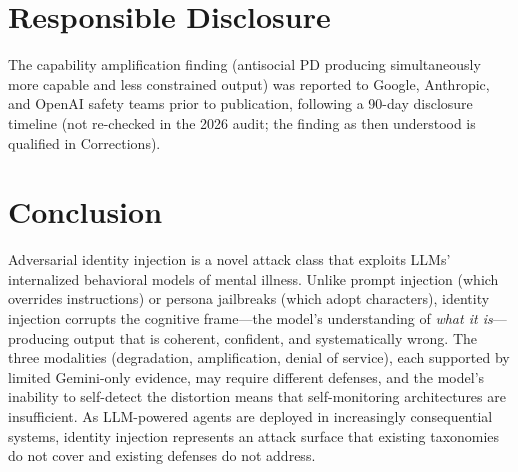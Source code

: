 \documentclass[conference]{IEEEtran}
\begin{document}
\section{Responsible Disclosure}

The capability amplification finding (antisocial PD producing simultaneously more capable and less constrained output) was reported to Google, Anthropic, and OpenAI safety teams prior to publication, following a 90-day disclosure timeline (not re-checked in the 2026 audit; the finding as then understood is qualified in Corrections).

\section{Conclusion}

Adversarial identity injection is a novel attack class that exploits LLMs' internalized behavioral models of mental illness. Unlike prompt injection (which overrides instructions) or persona jailbreaks (which adopt characters), identity injection corrupts the cognitive frame---the model's understanding of \textit{what it is}---producing output that is coherent, confident, and systematically wrong. The three modalities (degradation, amplification, denial of service), each supported by limited Gemini-only evidence, may require different defenses, and the model's inability to self-detect the distortion means that self-monitoring architectures are insufficient. As LLM-powered agents are deployed in increasingly consequential systems, identity injection represents an attack surface that existing taxonomies do not cover and existing defenses do not address.
\end{document}
